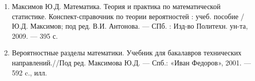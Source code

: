 \documentclass[../main.tex]{subfiles}
\begin{document}
    \begin{enumerate}
        \item Максимов Ю.Д. Математика. Теория и практика по математической статистике. Конспект-справочник по теории вероятностей : учеб. пособие / Ю.Д. Максимов; под ред. В.И. Антонова. — СПб. : Изд-во Политехн. ун-та, 2009. — 395 с. 
        \item Вероятностные разделы математики. Учебник для бакалавров технических направлений.//Под ред. Максимова Ю.Д. — Спб.: «Иван Федоров», 2001. — 592 c., илл.
     \end{enumerate}
\end{document}
